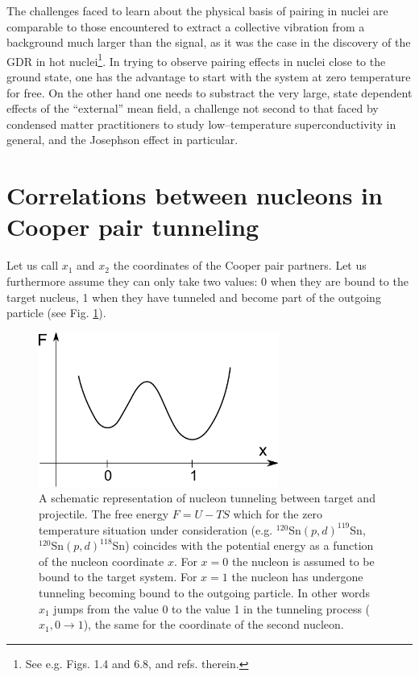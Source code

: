 The challenges faced to learn about the physical basis of pairing in nuclei are comparable to those encountered to extract a   collective vibration from a background much larger than the signal, as it was the case  in the discovery of the GDR in hot nuclei\footnote{See e.g. \cite{Bortignon:98} Figs. 1.4 and 6.8, and refs. therein.}. In trying to observe  pairing effects in nuclei close to the ground state, one has the advantage to start with the system at zero temperature for free. On the other hand one needs to substract the very large, state dependent effects of the ``external'' mean field, a challenge not second to that faced by condensed matter practitioners to study low--temperature superconductivity in general, and the Josephson effect in particular.  


\section[Correlations in Cooper pair tunneling]{Correlations between nucleons in Cooper pair tunneling}\label{C3S3}
Let us call $x_1$ and $x_2$ the coordinates of the Cooper pair partners. Let us furthermore assume they can only take two values: 0 when they are bound to the target nucleus, 1 when they have tunneled and become part of the outgoing particle (see Fig. \ref{fig3.3.1}).
\begin{figure}
\centerline{\includegraphics*[width=0.7\textwidth,angle=0]{nutshell/figs/fig3_3_1.pdf}}
\caption{A schematic representation of nucleon tunneling between target and projectile. The free energy $F=U-TS$ which for the zero temperature situation under consideration (e.g. $^{120}$Sn$(p,d)^{119}$Sn, $^{120}$Sn$(p,d)^{118}$Sn) coincides with the potential energy as a function of the nucleon coordinate $x$. For $x=0$ the nucleon is assumed to be bound to the target system. For $x=1$ the nucleon has undergone tunneling becoming bound to the outgoing particle. In other words $x_1$ jumps from the value 0 to the value 1 in the tunneling process ($x_1, 0\rightarrow 1$), the same for the coordinate of the second nucleon.}\label{fig3.3.1}
\end{figure}

